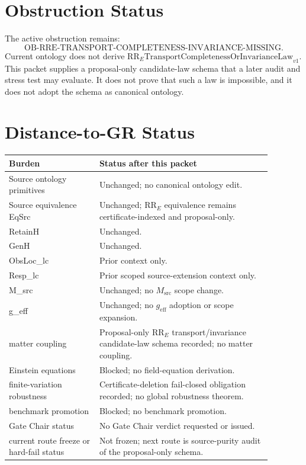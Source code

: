 \documentclass[11pt]{article}
\newcommand{\RRE}{\mathrm{RR}_{E}}
\newcommand{\LawRR}{\mathrm{RR}_{E}\mathrm{TransportCompletenessOrInvarianceLaw}_{v1}}
\newcommand{\ObRR}{\mathrm{OB}\text{-}\mathrm{RRE}\text{-}\mathrm{TRANSPORT}\text{-}\mathrm{COMPLETENESS}\text{-}\mathrm{INVARIANCE}\text{-}\mathrm{MISSING}}
\newcommand{\geff}{g_{\mathrm{eff}}}
\begin{document}
\section{Obstruction Status}

The active obstruction remains:
\[
  \ObRR .
\]
Current ontology does not derive \(\LawRR\). This packet supplies a
proposal-only candidate-law schema that a later audit and stress test may
evaluate. It does not prove that such a law is impossible, and it does not
adopt the schema as canonical ontology.

\section{Distance-to-GR Status}

\begin{longtable}{p{0.30\linewidth}p{0.58\linewidth}}
\toprule
Burden & Status after this packet \\
\midrule
Source ontology primitives & Unchanged; no canonical ontology edit. \\
Source equivalence EqSrc & Unchanged; \(\RRE\) equivalence remains certificate-indexed and proposal-only. \\
RetainH & Unchanged. \\
GenH & Unchanged. \\
ObsLoc\_lc & Prior context only. \\
Resp\_lc & Prior scoped source-extension context only. \\
M\_src & Unchanged; no \(M_{\mathrm{src}}\) scope change. \\
g\_eff & Unchanged; no \(\geff\) adoption or scope expansion. \\
matter coupling & Proposal-only \(\RRE\) transport/invariance candidate-law schema recorded; no matter coupling. \\
Einstein equations & Blocked; no field-equation derivation. \\
finite-variation robustness & Certificate-deletion fail-closed obligation recorded; no global robustness theorem. \\
benchmark promotion & Blocked; no benchmark promotion. \\
Gate Chair status & No Gate Chair verdict requested or issued. \\
current route freeze or hard-fail status & Not frozen; next route is source-purity audit of the proposal-only schema. \\
\bottomrule
\end{longtable}
\end{document}
